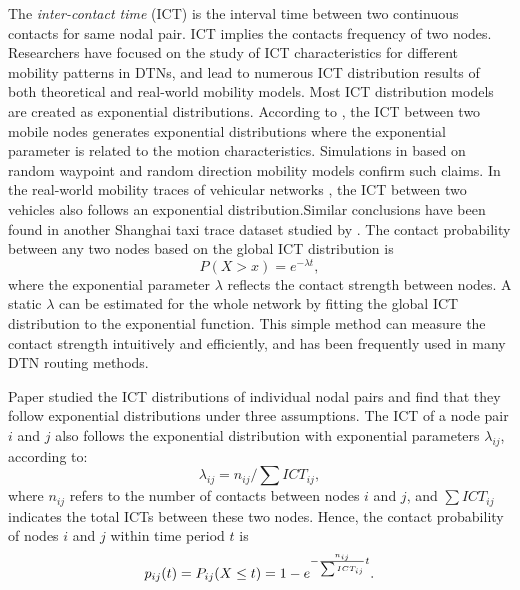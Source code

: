 \documentclass[conference]{IEEEtran}
\begin{document}
The \emph{inter-contact time} (ICT) is the interval time between two continuous contacts for same nodal pair. ICT implies the contacts frequency of two nodes. Researchers have focused on the study of ICT characteristics for different mobility patterns in DTNs, and lead to numerous ICT distribution results of both theoretical and real-world mobility models. Most ICT distribution models are created as exponential distributions. According to \cite{qGroeneveltNain-18,vHuWang-23,yJiangLi-26} , the ICT between two mobile nodes generates exponential distributions where the exponential parameter is related to the motion characteristics. Simulations in \cite{qGroeneveltNain-18,z20102212975997} based on random waypoint and random direction mobility models confirm such claims.
In the real-world mobility traces of vehicular networks \cite{zaZhuLi-28}, the ICT between two vehicles also follows an exponential distribution.Similar conclusions have been found in another Shanghai taxi trace dataset studied by  \cite{zaZhuLi-28,zb20080311017302}. The contact probability between any two nodes based on the global ICT distribution is
 \begin{equation}
    P(X>x)=e^{-\lambda t},
 \end{equation}
where the exponential parameter $\lambda$ reflects the contact strength between nodes. A static $\lambda$ can be estimated for the whole network by fitting the global ICT distribution to the exponential function. This simple method can measure the contact strength intuitively and efficiently, and has been frequently used in many DTN routing methods.

 Paper \cite{vHuWang-23} studied the ICT distributions of individual nodal pairs and find that they follow exponential distributions under three assumptions. The ICT of a node pair $i$ and $j$ also follows the exponential distribution with exponential parameters $\lambda_{ij}$, according to:
 \begin{equation}\label{equation_label_lambda}
        \lambda_{ij} = n_{ij}/\sum ICT_{ij},
 \end{equation}
where $n_{ij}$ refers to the number of contacts between nodes $i$ and $j$, and $\sum ICT_{ij}$ indicates the total ICTs between these two nodes. Hence, the contact probability of nodes $i$ and $j$ within time period $t$ is
\begin{equation}\label{equation_label_probability}
    p_{ij}(t)=P_{ij}(X\leq t)= 1-e^{-{n_{ij}\over {\sum ICT_{ij}}}t}.
 \end{equation}
\end{document}
